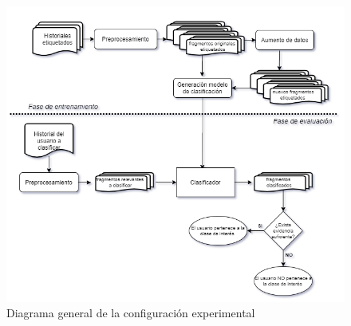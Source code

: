 \begin{figure}[h]
    \includegraphics[width=\textwidth]{sections/figures/diagrama_general.png}
    \caption{Diagrama general de la configuración experimental}
    \label{fig:metodologia}
\end{figure}